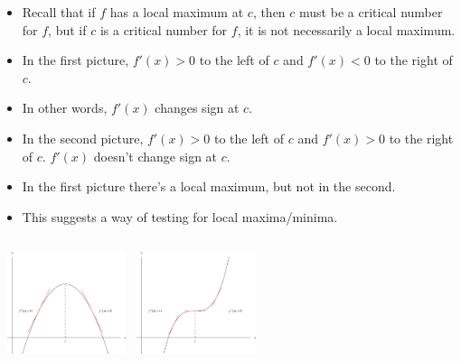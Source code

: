 \begin{frame}
\begin{itemize}
\item  Recall that if $f$ has a local maximum at $c$, then $c$ must be a critical number for $f$, but if $c$ is a critical number for $f$, it is not necessarily a local maximum.
\item<2->  In the first picture, $f'(x) > 0$ to the left of $c$ and $f'(x) < 0$ to the right of $c$.
\item<3->  In other words, $f'(x)$ changes sign at $c$.
\item<4->  In the second picture, $f'(x) > 0$ to the left of $c$ and $f'(x) > 0$ to the right of $c$.  $f'(x)$ doesn't change sign at $c$.
\item<5->  In the first picture there's a local maximum, but not in the second.
\item<6->  This suggests a way of testing for local maxima/minima.
\end{itemize}
\begin{columns}[c]
\ \includegraphics[height=3cm]{curve-sketching/pictures/04-03-firstderiva.pdf}%
\ \includegraphics[height=3cm]{curve-sketching/pictures/04-03-firstderivc.pdf}%
\end{columns}
\end{frame}



